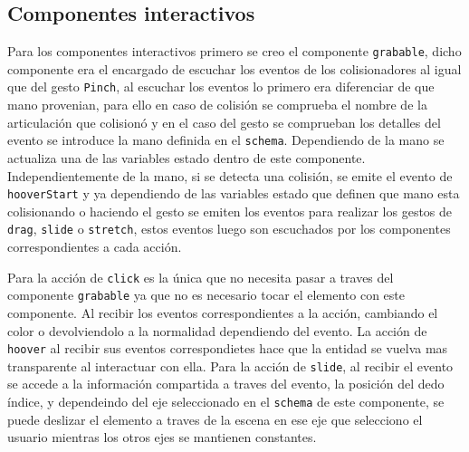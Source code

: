 \documentclass[a4paper, 12pt]{book}
\begin{document}
\subsection{Componentes interactivos}
\label{subsec:componentes-interactivos}
Para los componentes interactivos primero se creo el componente \texttt{grabable}, dicho componente era el encargado de escuchar los eventos de los colisionadores al igual que del gesto \texttt{Pinch}, al escuchar los eventos lo primero era diferenciar de que mano provenian, para ello en caso de colisión se comprueba el nombre de la articulación que colisionó y en el caso del gesto se comprueban los detalles del evento se introduce la mano definida en el \texttt{schema}. Dependiendo de la mano se actualiza una de las variables estado dentro de este componente. Independientemente de la mano, si se detecta una colisión,
se emite el evento de \texttt{hooverStart} y ya dependiendo de las variables estado que definen que mano esta colisionando o haciendo el gesto se emiten los eventos para realizar los gestos de \texttt{drag}, \texttt{slide} o \texttt{stretch}, estos eventos luego son escuchados por los componentes correspondientes a cada acción.

Para la acción de \texttt{click} es la única que no necesita pasar a traves del componente \texttt{grabable} ya que no es necesario tocar el elemento con este componente. 
Al recibir los eventos correspondientes a la acción, cambiando el color o devolviendolo a la normalidad dependiendo del evento. 
La acción de \texttt{hoover} al recibir sus eventos correspondietes hace que la entidad se vuelva mas transparente al interactuar con ella.
Para la acción de \texttt{slide}, al recibir el evento se accede a la información compartida a traves del evento, la posición del dedo índice, y dependeindo del eje seleccionado en el \texttt{schema} de este componente, se puede deslizar el elemento a traves de la escena en ese eje que selecciono el usuario mientras los otros ejes se mantienen constantes.
\end{document}
